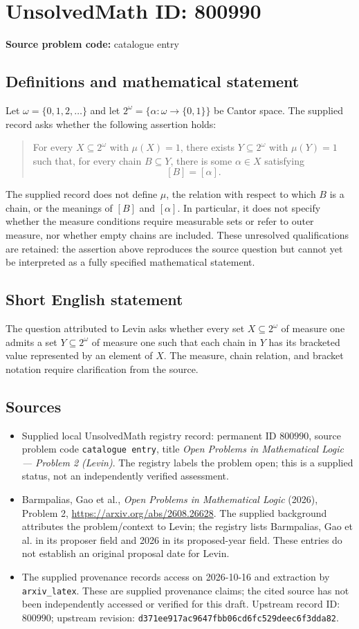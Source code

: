\documentclass[11pt]{article}
\begin{document}
\section*{UnsolvedMath ID: 800990}
\textbf{Source problem code:} catalogue entry
\subsection{Definitions and mathematical statement}
Let \(\omega=\{0,1,2,\ldots\}\) and let \(2^\omega=\{\alpha:\omega\to\{0,1\}\}\) be Cantor space. The supplied record asks whether the following assertion holds:
\begin{quote}
For every \(X\subseteq 2^\omega\) with \(\mu(X)=1\), there exists \(Y\subseteq 2^\omega\) with \(\mu(Y)=1\) such that, for every chain \(B\subseteq Y\), there is some \(\alpha\in X\) satisfying
\[
[B]=[\alpha].
\]
\end{quote}
The supplied record does not define \(\mu\), the relation with respect to which \(B\) is a chain, or the meanings of \([B]\) and \([\alpha]\). In particular, it does not specify whether the measure conditions require measurable sets or refer to outer measure, nor whether empty chains are included. These unresolved qualifications are retained: the assertion above reproduces the source question but cannot yet be interpreted as a fully specified mathematical statement.
\subsection{Short English statement}
The question attributed to Levin asks whether every set \(X\subseteq 2^\omega\) of measure one admits a set \(Y\subseteq 2^\omega\) of measure one such that each chain in \(Y\) has its bracketed value represented by an element of \(X\). The measure, chain relation, and bracket notation require clarification from the source.
\subsection{Sources}
\begin{itemize}
\item Supplied local UnsolvedMath registry record: permanent ID \(800990\), source problem code \texttt{catalogue entry}, title \emph{Open Problems in Mathematical Logic --- Problem 2 (Levin)}. The registry labels the problem open; this is a supplied status, not an independently verified assessment.
\item Barmpalias, Gao et al., \emph{Open Problems in Mathematical Logic} (2026), Problem 2, \url{https://arxiv.org/abs/2608.26628}. The supplied background attributes the problem/context to Levin; the registry lists Barmpalias, Gao et al. in its proposer field and 2026 in its proposed-year field. These entries do not establish an original proposal date for Levin.
\item The supplied provenance records access on 2026-10-16 and extraction by \texttt{arxiv\_latex}. These are supplied provenance claims; the cited source has not been independently accessed or verified for this draft. Upstream record ID: \(800990\); upstream revision: \texttt{d371ee917ac9647fbb06cd6fc529deec6f3dda82}.
\end{itemize}
\end{document}
